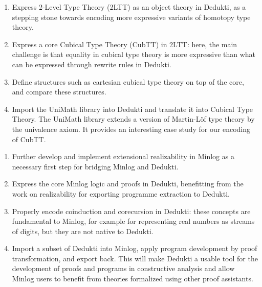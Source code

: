 \begin{workpackage}[id=theories,wphases=0-48,type=RTD,
  short=Theories,%
  title= Theories,
  lead=Inn,
  InnRM=6,
  BiaRM=48,
  LmuRM=12,
  SacRM=36,
  InrRM=24,
  ]
\begin{tasklist}
\begin{task}[id=hott,
  title=Express Homotopy Type Theory in Dedukti,
  lead=Inr, %
  InrRM=0, %
  BirRM=0 %
  ]
  \begin{enumerate}
  \item Express 2-Level Type Theory (2LTT) as an object theory in Dedukti, as
    a stepping stone towards encoding more expressive variants of homotopy type
    theory.
  \item Express a core Cubical Type Theory (CubTT) in 2LTT: here, the main challenge is
    that equality in cubical type theory is more expressive than what can be
    expressed through rewrite rules in Dedukti.
  \item Define structures such as cartesian cubical type theory on top of the
    core, and compare these structures.
  \item Import the UniMath library into Dedukti and translate it into Cubical
    Type Theory. The UniMath library extends a version of
    Martin-Löf type theory by the univalence axiom. It provides an interesting
    case study for our encoding of CubTT.
  \end{enumerate}
\end{task}

\begin{task}[id=minlog,
  title=Express the theory of Minlog in Dedukti,
  lead=Lmu,
  LmuRM=0 %
  ]
  \begin{enumerate}
  \item Further develop and implement extensional realizability in Minlog as
    a necessary first step for bridging Minlog and Dedukti.
  \item Express the core Minlog logic and proofs in Dedukti, benefitting from
    the work on realizability for exporting programme extraction to Dedukti.
  \item Properly encode coinduction and corecursion in Dedukti: these concepts are
    fundamental to Minlog, for example for representing real numbers as streams of
    digits, but they are not native to Dedukti.
  \item Import a subset of Dedukti into Minlog, apply program development by proof
    transformation, and export back. This will make Dedukti a usable tool for the
    development of proofs and programs in constructive analysis and allow Minlog
    users to benefit from theories formalized using other proof assistants.
  \end{enumerate}
\end{task}


\end{tasklist}
\end{workpackage}
